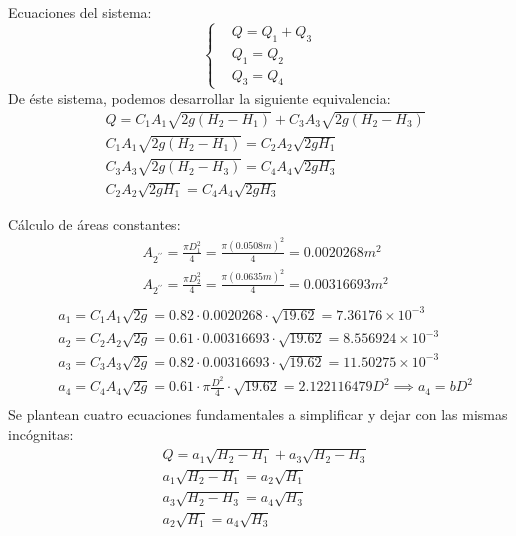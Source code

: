     Ecuaciones del sistema:
    \begin{equation*}
        \begin{cases}
            &Q = Q_1 + Q_3\\
            &Q_1 =Q_2\\
            &Q_3 = Q_4 
        \end{cases}
    \end{equation*}
    De éste sistema, podemos desarrollar la siguiente equivalencia:
    \begin{align*}
        &Q = C_1 A_1 \sqrt{2g\left(H_2 - H_1\right)} + C_3A_3 \sqrt{2g\left(H_2 - H_3\right)}\\
        &C_1A_1 \sqrt{2g\left(H_2 - H_1\right)} = C_2A_2 \sqrt{2gH_1}\\
        &C_3A_3 \sqrt{2g\left(H_2 - H_3\right)} = C_4A_4 \sqrt{2gH_3}\\ 
        &C_2A_2 \sqrt{2gH_1} = C_4A_4 \sqrt{2gH_3}
    \end{align*}
    
    Cálculo de áreas constantes:
    \begin{align*}
        &A_{2^{\prime\prime}}=\frac{\pi D^2_1}{4} = \frac{\pi (0.0508m)^2}{4} = 0.0020268m^2\\
        &A_{2^{\prime\prime}}=\frac{\pi D^2_2}{4} = \frac{\pi (0.0635m)^2}{4} = 0.00316693m^2\\
    \end{align*}
\begin{align*}
        &a_1 = C_1A_1 \sqrt{2g} = 0.82\cdot 0.0020268\cdot \sqrt{19.62} =  7.36176 \times 10^{-3}\\
        &a_2 = C_2A_2 \sqrt{2g} = 0.61\cdot 0.00316693\cdot \sqrt{19.62} = 8.556924 \times 10^{-3}\\
        &a_3 = C_3A_3 \sqrt{2g} = 0.82\cdot 0.00316693\cdot \sqrt{19.62} = 11.50275 \times 10^{-3}\\
        &a_4 = C_4A_4 \sqrt{2g} = 0.61\cdot \pi \frac{D^2}{4} \cdot \sqrt{19.62} =  2.122116479 D^2\implies a_4 = bD^2\\
    \end{align*}
    Se plantean cuatro ecuaciones fundamentales a simplificar y dejar con las mismas incógnitas:
    \begin{align*}
        &Q = a_1 \sqrt{H_2 - H_1} + a_3 \sqrt{H_2 - H_3}\\
        &a_1 \sqrt{H_2 - H_1} = a_2 \sqrt{H_1}\\
        &a_3 \sqrt{H_2 - H_3} = a_4 \sqrt{H_3}\\
        &a_2 \sqrt{H_1} = a_4 \sqrt{H_3}
    \end{align*}
    

